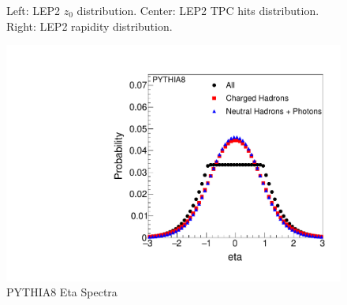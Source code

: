\begin{figure}[H]
\centering
{}\hfill
{}\hfill %
\hfill %
\caption{Left: LEP2 $z_0$ distribution. Center: LEP2 TPC hits distribution. Right: LEP2 rapidity distribution.}
\end{figure}

\begin{figure}[H]
\begin{center}
\includegraphics[width=.45\textwidth]{images/DataQualityCheck/PYTHIA8_eta.pdf}
\caption{PYTHIA8 Eta Spectra}
\label{fig:figure7} 
\end{center}
\end{figure}

